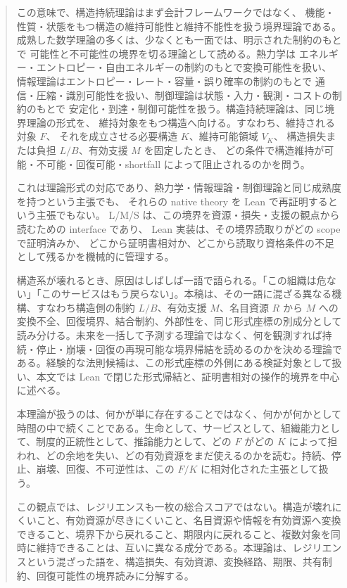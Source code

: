 \documentclass[12pt,a4paper]{article}
\begin{document}
\begin{abstract}
この意味で、構造持続理論はまず会計フレームワークではなく、 機能・性質・状態をもつ構造の維持可能性と維持不能性を扱う境界理論である。 成熟した数学理論の多くは、少なくとも一面では、明示された制約のもとで 可能性と不可能性の境界を切る理論として読める。熱力学は エネルギー・エントロピー・自由エネルギーの制約のもとで変換可能性を扱い、 情報理論はエントロピー・レート・容量・誤り確率の制約のもとで 通信・圧縮・識別可能性を扱い、制御理論は状態・入力・観測・コストの制約のもとで 安定化・到達・制御可能性を扱う。構造持続理論は、同じ境界理論の形式を、 維持対象をもつ構造へ向ける。すなわち、維持される対象 \(F\)、 それを成立させる必要構造 \(K\)、維持可能領域 \(V_K\)、 構造損失または負担 \(L/B\)、有効支援 \(M\) を固定したとき、 どの条件で構造維持が可能・不可能・回復可能・shortfall によって阻止されるのかを問う。

これは理論形式の対応であり、熱力学・情報理論・制御理論と同じ成熟度を持つという主張でも、 それらの native theory を Lean で再証明するという主張でもない。 L/M/S は、この境界を資源・損失・支援の観点から読むための interface であり、 Lean 実装は、その境界読取りがどの scope で証明済みか、 どこから証明書相対か、どこから読取り資格条件の不足として残るかを機械的に管理する。

構造系が壊れるとき、原因はしばしば一語で語られる。「この組織は危ない」「このサービスはもう戻らない」。本稿は、その一語に混ざる異なる機構、すなわち構造側の制約 \(L/B\)、有効支援 \(M\)、名目資源 \(R\) から \(M\) への変換不全、回復境界、結合制約、外部性を、同じ形式座標の別成分として読み分ける。未来を一括して予測する理論ではなく、何を観測すれば持続・停止・崩壊・回復の再現可能な境界帰結を読めるのかを決める理論である。経験的な法則候補は、この形式座標の外側にある検証対象として扱い、本文では Lean で閉じた形式帰結と、証明書相対の操作的境界を中心に述べる。

本理論が扱うのは、何かが単に存在することではなく、何かが何かとして時間の中で続くことである。生命として、サービスとして、組織能力として、制度的正統性として、推論能力として、どの \(F\) がどの \(K\) によって担われ、どの余地を失い、どの有効資源をまだ使えるのかを読む。持続、停止、崩壊、回復、不可逆性は、この \(F/K\) に相対化された主張として扱う。

この観点では、レジリエンスも一枚の総合スコアではない。構造が壊れにくいこと、有効資源が尽きにくいこと、名目資源や情報を有効資源へ変換できること、境界下から戻れること、期限内に戻れること、複数対象を同時に維持できることは、互いに異なる成分である。本理論は、レジリエンスという混ざった語を、構造損失、有効資源、変換経路、期限、共有制約、回復可能性の境界読みに分解する。


\end{abstract}
\end{document}
